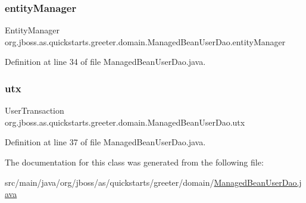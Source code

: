 \subsubsection{\texorpdfstring{entity\+Manager}{entityManager}}
{\footnotesize\ttfamily Entity\+Manager org.\+jboss.\+as.\+quickstarts.\+greeter.\+domain.\+Managed\+Bean\+User\+Dao.\+entity\+Manager\hspace{0.3cm}{\ttfamily [private]}}



Definition at line 34 of file Managed\+Bean\+User\+Dao.\+java.

\mbox{\label{classorg_1_1jboss_1_1as_1_1quickstarts_1_1greeter_1_1domain_1_1_managed_bean_user_dao_a327af0fd29d3e88695e0a497fecd7ffc}} 
\subsubsection{\texorpdfstring{utx}{utx}}
{\footnotesize\ttfamily User\+Transaction org.\+jboss.\+as.\+quickstarts.\+greeter.\+domain.\+Managed\+Bean\+User\+Dao.\+utx\hspace{0.3cm}{\ttfamily [private]}}



Definition at line 37 of file Managed\+Bean\+User\+Dao.\+java.



The documentation for this class was generated from the following file\+:\begin{DoxyCompactItemize}
\item 
src/main/java/org/jboss/as/quickstarts/greeter/domain/\hyperlink{_managed_bean_user_dao_8java}{Managed\+Bean\+User\+Dao.\+java}\end{DoxyCompactItemize}
